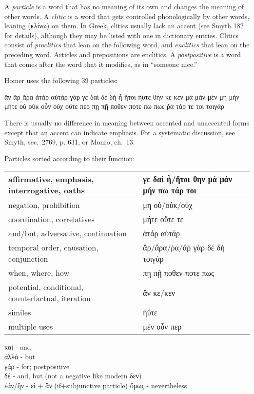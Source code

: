 \begin{small}
A \emph{particle} is a word that has no meaning of its own and changes the meaning of other words.
A \emph{clitic} is a word that gets controlled phonologically by other words, leaning (κλίνω) on them. In Greek,
clitics usually lack an accent (see Smyth 182 for details), although they may be listed with one in dictionary entries.
Clitics consist of \emph{proclitics} that lean on the following word, and
\emph{enclitics} that lean on the preceding word. Articles and prepositions are enclitics.
A \emph{postpositive} is a word that comes after the word that it modifies, as in ``someone nice.''


Homer uses the following 39 particles:


ἄν ἄρ ἄρα ἀτάρ αὐτάρ γάρ γε δαί δέ δή ἦ ἤτοι ἠΰτε θην κε κεν μά μάν μέν μη μήν μήτε οὐ οὐκ οὖν οὐχ οὔτε περ πῃ πῇ ποθεν ποτε πω πως ῥα τάρ τε τοι τοιγάρ

There is usually no difference in meaning between accented and unaccented forms except that an accent can indicate emphasis.
For a systematic discussion, see Smyth, sec.~2769, p. 631, or Monro, ch.~13.

Particles sorted according to their function:

\begin{tabular}{p{1.6in}p{2.7in}}
affirmative, emphasis, \mbox{interrogative}, oaths &
  γε δαί ἦ/ἤτοι θην μά μάν μήν πω τάρ τοι \tabularnewline \hline
negation, prohibition &
  μη οὐ/οὐκ/οὐχ \tabularnewline \hline
coordination, correlatives &
  μήτε οὔτε τε \tabularnewline \hline
and/but, adversative, \mbox{continuation} &
  ἀτάρ αὐτάρ \tabularnewline \hline
temporal order, causation, conjunction &
  ἄρ/ἄρα/ῥα/ἄῤ γάρ δέ δή τοιγάρ \tabularnewline \hline
when, where, how &
  πῃ πῇ ποθεν ποτε πως \tabularnewline \hline
potential, conditional, \mbox{counterfactual}, iteration &
  ἄν κε/κεν \tabularnewline \hline
similes &
  ἠΰτε \tabularnewline \hline
multiple uses &
  μέν οὖν περ
\end{tabular}


καί - and\\
ἀλλά - but\\
γάρ - for; postpositive\\
δέ - and, but (not a negative like modern δεν)\\
ἐάν/ἤν - εἰ + ἄν (if+subjunctive particle)
ὅμως - nevertheless\\


\end{small}
